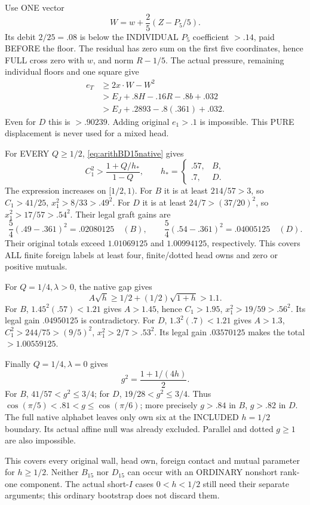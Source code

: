 \documentclass[11pt]{article}
\begin{document}
Use ONE vector
\[
                         W=w+{\frac{2}{5}}(Z-P_5/5).
\]
Its debit \(2/25=.08\) is below the INDIVIDUAL
\(P_5\) coefficient \(>.14\), paid BEFORE the floor.
The residual has zero sum on the first five coordinates,
hence FULL cross zero with \(w\), and norm \(R-1/5\).
The actual pressure, remaining individual floors and
one square give
\[
 \begin{split}
 e_T&\ge2x\cdot W-W^2\\
    &>E_J+.8H-.16R-.8b+.032\\
    &>E_J+.2893-.8(.361)+.032 .
 \end{split}
\]
Even for \(D\) this is \(>.90239\).
Adding original \(e_1>.1\) is impossible.
This PURE displacement is never used for a mixed head.

For EVERY \(Q\ge1/2\),
\eqref{eq:arithBD15native} gives
\[
 C_1^2>{\frac{1+Q/h_*}{1-Q}},\qquad
 h_*=\begin{cases}.57,&B,\\ .7,&D.\end{cases}
\]
The expression increases on \([1/2,1)\).
For \(B\) it is at least \(214/57>3\),
so \(C_1>41/25\), \(x_1^2>8/33>.49^2\).
For \(D\) it is at least \(24/7>(37/20)^2\),
so \(x_1^2>17/57>.54^2\).
Their legal graft gains are
\[
 {\frac{5}{4}}(.49-.361)^2=.02080125\quad(B),\qquad
 {\frac{5}{4}}(.54-.361)^2=.04005125\quad(D).
\]
Their original totals exceed \(1.01069125\)
and \(1.00994125\), respectively.
This covers ALL finite foreign labels at least four,
finite/dotted head owns and zero or positive mutuals.

For \(Q=1/4,\lambda>0\), the native gap gives
\[
                 A\sqrt h\ge1/2+(1/2)\sqrt{1+h}>1.1 .
\]
For \(B\), \(1.45^2(.57)<1.21\) gives \(A>1.45\),
hence \(C_1>1.95\), \(x_1^2>19/59>.56^2\).
Its legal gain \(.04950125\) is contradictory.
For \(D\), \(1.3^2(.7)<1.21\) gives \(A>1.3\),
\(C_1^2>244/75>(9/5)^2\), \(x_1^2>2/7>.53^2\).
Its legal gain \(.03570125\) makes the total
\(>1.00559125\).

Finally \(Q=1/4,\lambda=0\) gives
\[
                         g^2={\frac{1+1/(4h)}{2}}.
\]
For \(B\), \(41/57<g^2\le3/4\);
for \(D\), \(19/28<g^2\le3/4\).
Thus
\(\cos(\pi/5)<.81<g\le\cos(\pi/6)\);
more precisely \(g>.84\) in \(B\), \(g>.82\) in \(D\).
The full native alphabet leaves only own six at the
INCLUDED \(h=1/2\) boundary.
Its actual affine null was already excluded.
Parallel and dotted \(g\ge1\) are also impossible.

This covers every original wall, head own, foreign
contact and mutual parameter for \(h\ge1/2\).
Neither \(B_{15}\) nor \(D_{15}\) can occur with an
ORDINARY nonshort rank-one component.
The actual short-\(I\) cases \(0<h<1/2\) still need
their separate arguments; this ordinary bootstrap
does not discard them.
\end{document}
